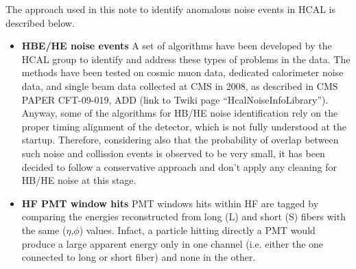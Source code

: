 The approach used in this note to identify anomalous noise events in HCAL is described below.

\begin{itemize}
%
\item{\bf HBE/HE noise events} A set of algorithms have been developed by the HCAL group to 
identify and address these types of problems in the data. The methods have been tested on cosmic muon data, 
dedicated calorimeter noise data, and single beam data collected at CMS in 2008, 
as described in CMS PAPER CFT-09-019, ADD (link to Twiki page ``HcalNoiseInfoLibrary''). 
Anyway, some of the algorithms for HB/HE noise identification rely on the proper 
timing alignment of the detector, which is not fully understood at the startup.
Therefore, considering also that the probability of overlap between such noise and 
collission events is observed to be very small, it has been decided to follow a conservative approach and 
don't apply any cleaning for HB/HE noise at this stage.
%
\item{\bf HF PMT window hits} PMT windows hits within HF are tagged by comparing 
the energies reconstructed from long (L) and short (S) fibers with the same ($\eta$,$\phi$) values. 
Infact, a particle hitting directly a PMT would produce a large apparent energy only in one channel 
(i.e. either the one connected to long or short fiber) and none in the other.


\end{itemize}
